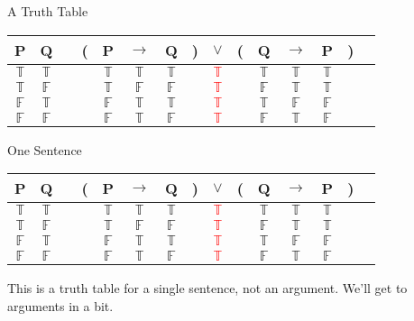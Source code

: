 \documentclass[
  ignorenonframetext,
]{beamer}
\renewcommand{\,}{\text{, }}
\def\True{\mathbb{T}}
\def\False{\mathbb{F}}
\begin{document}
\begin{frame}{A Truth Table}
\protect\hypertarget{a-truth-table}{}

\begin{center}
\begin{tabular}{@{ }c@{ }@{ }c | c@{ }@{}c@{}@{ }c@{ }@{ }c@{ }@{ }c@{ }@{}c@{}@{ }c@{ }@{}c@{}@{ }c@{ }@{ }c@{ }@{ }c@{ }@{}c@{}@{ }c}
P & Q &  & ( & P & $\rightarrow$ & Q & ) & $\lor$ & ( & Q & $\rightarrow$ & P & ) & \\
\hline 
$\True$ & $\True$ &  &  & $\True$ & $\True$ & $\True$ &  & \textcolor{red}{$\True$} &  & $\True$ & $\True$ & $\True$ &  & \\
$\True$ & $\False$ &  &  & $\True$ & $\False$ & $\False$ &  & \textcolor{red}{$\True$} &  & $\False$ & $\True$ & $\True$ &  & \\
$\False$ & $\True$ &  &  & $\False$ & $\True$ & $\True$ &  & \textcolor{red}{$\True$} &  & $\True$ & $\False$ & $\False$ &  & \\
$\False$ & $\False$ &  &  & $\False$ & $\True$ & $\False$ &  & \textcolor{red}{$\True$} &  & $\False$ & $\True$ & $\False$ &  & \\
\end{tabular}
\bigskip
\end{center}

\end{frame}

\begin{frame}{One Sentence}
\protect\hypertarget{one-sentence}{}

\begin{center}
\begin{tabular}{@{ }c@{ }@{ }c | c@{ }@{}c@{}@{ }c@{ }@{ }c@{ }@{ }c@{ }@{}c@{}@{ }c@{ }@{}c@{}@{ }c@{ }@{ }c@{ }@{ }c@{ }@{}c@{}@{ }c}
P & Q &  & ( & P & $\rightarrow$ & Q & ) & $\lor$ & ( & Q & $\rightarrow$ & P & ) & \\
\hline 
$\True$ & $\True$ &  &  & $\True$ & $\True$ & $\True$ &  & \textcolor{red}{$\True$} &  & $\True$ & $\True$ & $\True$ &  & \\
$\True$ & $\False$ &  &  & $\True$ & $\False$ & $\False$ &  & \textcolor{red}{$\True$} &  & $\False$ & $\True$ & $\True$ &  & \\
$\False$ & $\True$ &  &  & $\False$ & $\True$ & $\True$ &  & \textcolor{red}{$\True$} &  & $\True$ & $\False$ & $\False$ &  & \\
$\False$ & $\False$ &  &  & $\False$ & $\True$ & $\False$ &  & \textcolor{red}{$\True$} &  & $\False$ & $\True$ & $\False$ &  & \\
\end{tabular}
\bigskip
\end{center}

This is a truth table for a single sentence, not an argument. We'll get
to arguments in a bit.

\end{frame}
\end{document}
